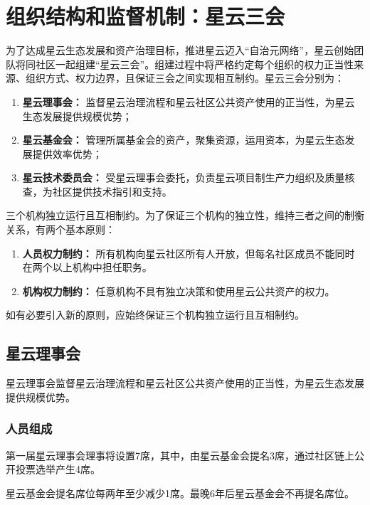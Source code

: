\section{组织结构和监督机制：星云三会}

为了达成星云生态发展和资产治理目标，推进星云迈入“自治元网络”，星云创始团队将同社区一起组建“星云三会”。组建过程中将严格约定每个组织的权力正当性来源、组织方式、权力边界，且保证三会之间实现相互制约。星云三会分别为：

\begin{enumerate}
	\item \textbf{星云理事会：} 监督星云治理流程和星云社区公共资产使用的正当性，为星云生态发展提供规模优势；
	\item \textbf{星云基金会：} 管理所属基金会的资产，聚集资源，运用资本，为星云生态发展提供效率优势；
	\item \textbf{星云技术委员会：} 受星云理事会委托，负责星云项目制生产力组织及质量核查，为社区提供技术指引和支持。
\end{enumerate}

\vspace{2em}

三个机构独立运行且互相制约。为了保证三个机构的独立性，维持三者之间的制衡关系，有两个基本原则：

\begin{enumerate}
	\item \textbf{人员权力制约：} 所有机构向星云社区所有人开放，但每名社区成员不能同时在两个以上机构中担任职务。
	\item \textbf{机构权力制约：} 任意机构不具有独立决策和使用星云公共资产的权力。
\end{enumerate}

如有必要引入新的原则，应始终保证三个机构独立运行且互相制约。

\subsection{星云理事会}

星云理事会监督星云治理流程和星云社区公共资产使用的正当性，为星云生态发展提供规模优势。

\subsubsection{人员组成}

第一届星云理事会理事将设置7席，其中，由星云基金会提名3席，通过社区链上公开投票选举产生4席。

星云基金会提名席位每两年至少减少1席。最晚6年后星云基金会不再提名席位。

